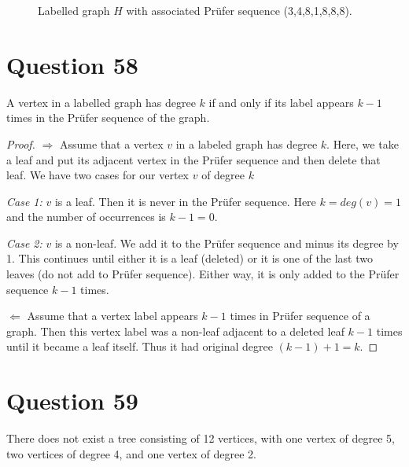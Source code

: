 \documentclass[11pt, oneside]{article}   	%
\begin{document}
\begin{enumerate}[\quad (a)]
\begin{figure}[h]
        \caption{Labelled graph $H$ with associated Pr\"{u}fer sequence (3,4,8,1,8,8,8).}
        \label{q57b}
	\end{figure}
\end{enumerate}


\section*{Question 58}

A vertex in a labelled graph has degree $k$ if and only if its label appears $k-1$ times in the Pr\"{u}fer sequence of the graph.
\begin{proof}
$\Rightarrow$ Assume that a vertex $v$ in a labeled graph has degree $k$. Here, we take a leaf and put its adjacent vertex in the Pr\"{u}fer sequence and then delete that leaf. We have two cases for our vertex $v$ of degree $k$

\emph{Case 1:} $v$ is a leaf. Then it is never in the Pr\"{u}fer sequence. Here $k=deg(v)=1$ and the number of occurrences is $k-1= 0$.

\emph{Case 2:} $v$ is a non-leaf. We add it to the Pr\"{u}fer sequence and minus its degree by 1. This continues until either it is a leaf (deleted) or it is one of the last two leaves (do not add to Pr\"{u}fer sequence). Either way, it is only added to the Pr\"{u}fer sequence $k-1$ times. 

$\Leftarrow$ Assume that a vertex label appears $k-1$ times in Pr\"{u}fer sequence of a graph. Then this vertex label was a non-leaf adjacent to a deleted leaf $k-1$ times until it became a leaf itself. Thus it had original degree $(k-1)+1 = k$.
\end{proof}

\section*{Question 59}

There does not exist a tree consisting of 12 vertices, with one vertex of degree 5, two vertices of degree 4, and one vertex of degree 2.
\end{document}
